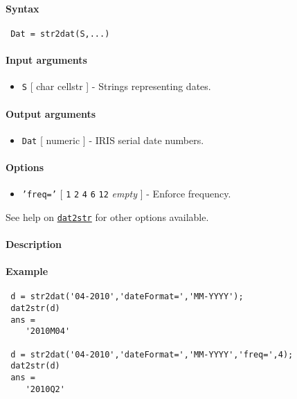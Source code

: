 


	\paragraph{Syntax}
 
 \begin{verbatim}
 Dat = str2dat(S,...)
 \end{verbatim}
 
 \paragraph{Input arguments}
 
 \begin{itemize}
 \item
   \texttt{S} {[} char \textbar{} cellstr {]} - Strings representing
   dates.
 \end{itemize}
 
 \paragraph{Output arguments}
 
 \begin{itemize}
 \item
   \texttt{Dat} {[} numeric {]} - IRIS serial date numbers.
 \end{itemize}
 
 \paragraph{Options}
 
 \begin{itemize}
 \item
   \texttt{'freq='} {[} \texttt{1} \textbar{} \texttt{2} \textbar{}
   \texttt{4} \textbar{} \texttt{6} \textbar{} \texttt{12} \textbar{}
   \emph{empty} {]} - Enforce frequency.
 \end{itemize}
 
 See help on \href{dates/dat2str}{\texttt{dat2str}} for other options
 available.
 
 \paragraph{Description}
 
 \paragraph{Example}
 
 \begin{verbatim}
 d = str2dat('04-2010','dateFormat=','MM-YYYY');
 dat2str(d)
 ans =
    '2010M04'
 
 d = str2dat('04-2010','dateFormat=','MM-YYYY','freq=',4);
 dat2str(d)
 ans =
    '2010Q2'
 \end{verbatim}


